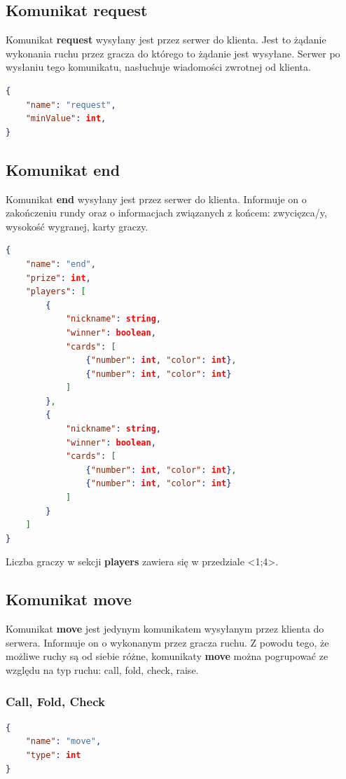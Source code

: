 \documentclass{article}
\begin{document}
    \subsection{Komunikat request}
    Komunikat \textbf{request} wysyłany jest przez serwer do klienta.
    Jest to żądanie wykonania ruchu przez gracza do którego to żądanie jest wysyłane.
    Serwer po wysłaniu tego komunikatu, nasłuchuje wiadomości zwrotnej od klienta.
    
        \begin{lstlisting}[language=json,firstnumber=1]
{
    "name": "request",
    "minValue": int,
}
        \end{lstlisting}
    
    \subsection{Komunikat end}
        Komunikat \textbf{end} wysyłany jest przez serwer do klienta.
        Informuje on o zakończeniu rundy oraz o informacjach związanych z końcem: zwycięzca/y, wysokość wygranej, karty graczy.
        \begin{lstlisting}[language=json,firstnumber=1]
{
    "name": "end",
    "prize": int,
    "players": [
        {
            "nickname": string,
            "winner": boolean,
            "cards": [
                {"number": int, "color": int},
                {"number": int, "color": int}
            ]
        },
        {
            "nickname": string,
            "winner": boolean,
            "cards": [
                {"number": int, "color": int},
                {"number": int, "color": int}
            ]
        }
    ]
}
        \end{lstlisting}
        Liczba graczy w sekcji \textbf{players} zawiera się w przedziale <1;4>.
    
    \subsection{Komunikat move}
        Komunikat \textbf{move} jest jedynym komunikatem wysyłanym przez klienta do serwera.
        Informuje on o wykonanym przez gracza ruchu.
        Z powodu tego, że możliwe ruchy są od siebie różne, komunikaty \textbf{move} można pogrupować ze względu na typ ruchu: call, fold, check, raise.
        
        \subsubsection{Call, Fold, Check}
            \begin{lstlisting}[language=json,firstnumber=1]
{
    "name": "move",
    "type": int
}
            \end{lstlisting}
\end{document}
